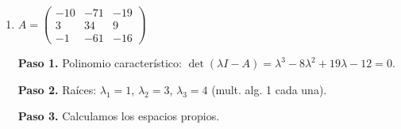 \begin{example}
\begin{enumerate}[$a)$]
\begin{myproof}
\textbf{Eigenvalor $\lambda=2$}:
\[
(2I - A) = \begin{pmatrix}
1 & -2 & -4 \\
0 & 0 & -3 \\
0 & 0 & -3
\end{pmatrix} \xrightarrow{f_3 - f_2 \to f_3} \begin{pmatrix}
1 & -2 & -4 \\
0 & 0 & -3 \\
0 & 0 & 0
\end{pmatrix}
\]
Solución: $v_2 = \begin{pmatrix} 2 \\ 1 \\ 0 \end{pmatrix}$ (mult. geom. 1).

\textbf{Eigenvalor $\lambda=5$}:
\[
(5I - A) = \begin{pmatrix}
4 & -2 & -4 \\
0 & 3 & -3 \\
0 & 0 & 0
\end{pmatrix} \xrightarrow{f_2/3 \to f_2} \begin{pmatrix}
4 & -2 & -4 \\
0 & 1 & -1 \\
0 & 0 & 0
\end{pmatrix}
\]
Solución: $v_3 = \begin{pmatrix} 3/2 \\ 1 \\ 1 \end{pmatrix}$ (mult. geom. 1).

\textbf{Paso 3.} En resumen:
\[
\boxed{\lambda=1,\ \lambda=2\ \text{y}\ \lambda=5,\ \text{cada uno con m.a.}=\text{m.g.}=1.}
\]
\end{myproof}
	
	\item $A=\left(\begin{matrix}
-10 & -71 & -19 \\
3 & 34 & 9 \\
-1 & -61 & -16
\end{matrix}\right)$ 
\begin{myproof}
\textbf{Paso 1.} Polinomio característico: $\det(\lambda I - A) = \lambda^3 - 8\lambda^2 + 19\lambda - 12 = 0$.

\textbf{Paso 2.} Raíces: $\lambda_1=1$, $\lambda_2=3$, $\lambda_3=4$ (mult. alg. 1 cada una).

\textbf{Paso 3.} Calculamos los espacios propios.


\end{myproof}
\end{enumerate}
\end{example}
